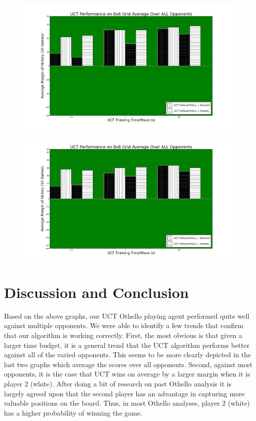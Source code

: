 \documentclass[12pt,letterpaper]{article}
\begin{document}
\begin{figure}[!hp]
\begin{center}
\includegraphics[scale=.4]{66_ALL}
\end{center}
\end{figure}

\begin{figure}[!hp]
\begin{center}
\includegraphics[scale=.4]{88_ALL}
\end{center}
\end{figure}


\pagebreak
\section{Discussion and Conclusion}
\label{conc}
Based on the above graphs, our UCT Othello playing agent performed quite well against multiple opponents. We were able to identify a few trends that confirm that our algorithm is working correctly.  First, the most obvious is that given a larger time budget, it is a general trend that the UCT algorithm performs better against all of the varied opponents. This seems to be more clearly depicted in the last two graphs which average the scores over all opponents. Second, against most opponents, it is the case that UCT wins on average by a larger margin when it is player 2 (white). After doing a bit of research on past Othello analysis it is largely agreed upon that the second player has an advantage in capturing more valuable positions on the board. Thus, in most Othello analyses, player 2 (white) has a higher probability of winning the game. 
\end{document}
